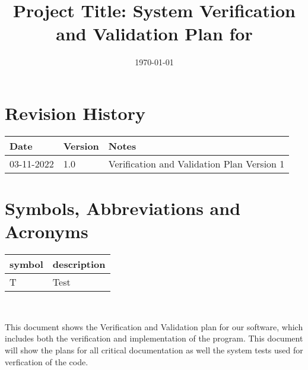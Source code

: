 \documentclass[12pt, titlepage]{article}
\begin{document}
\title{Project Title: System Verification and Validation Plan for \progname{}} 
\author{\authname}
\date{\today}
	
\maketitle


\section{Revision History}

\begin{tabularx}{\textwidth}{p{3cm}p{2cm}X}
\toprule {\bf Date} & {\bf Version} & {\bf Notes}\\
\midrule
03-11-2022 & 1.0 & Verification and Validation Plan Version 1\\
\bottomrule
\end{tabularx}

\newpage

\tableofcontents




\section{Symbols, Abbreviations and Acronyms}

\renewcommand{\arraystretch}{1.2}
\begin{tabular}{l l} 
  \toprule		
  \textbf{symbol} & \textbf{description}\\
  \midrule 
  T & Test\\
  \bottomrule
\end{tabular}\\


\newpage


This document shows the Verification and Validation plan for our software, which includes both the verification and implementation of the program. This document will show the plans for all critical documentation as well the system tests used for verfication of the code.
\end{document}
